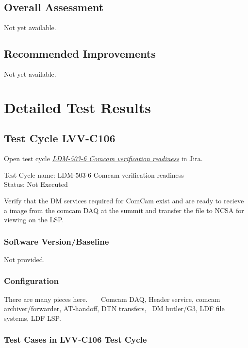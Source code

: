 \documentclass[DM,lsstdraft,STR,toc]{lsstdoc}
\begin{document}
\subsection{Overall Assessment}
\label{sect:overallassessment}

Not yet available.

\subsection{Recommended Improvements}
\label{sect:recommendations}

Not yet available.

\newpage
\section{Detailed Test Results}
\label{sect:detailedtestresults}

\subsection{Test Cycle LVV-C106 }

Open test cycle {\it \href{https://jira.lsstcorp.org/secure/Tests.jspa#/testrun/LVV-C106}{LDM-503-6 Comcam verification readiness}} in Jira.

Test Cycle name: LDM-503-6 Comcam verification readiness\\
Status: Not Executed

Verify that the DM services required for ComCam exist and are ready to
recieve a image from the comcam DAQ at the summit and transfer the file
to NCSA for viewing on the LSP.~ ~

\subsubsection{Software Version/Baseline}
Not provided.

\subsubsection{Configuration}
There are many pieces here. ~ ~ Comcam DAQ, Header service, comcam
archiver/forwarder, AT-handoff, DTN transfers, ~DM butler/G3, LDF file
systems, LDF LSP.~

\subsubsection{Test Cases in LVV-C106 Test Cycle}
\end{document}
